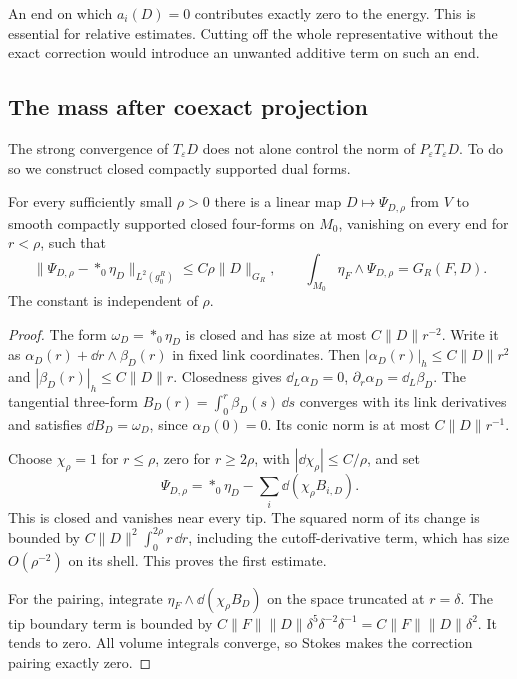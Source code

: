 An end on which $a_i(D)=0$ contributes exactly zero to the energy.
This is essential for relative estimates. Cutting off the whole
representative without the exact correction would introduce an
unwanted additive term on such an end.

\subsection{The mass after coexact projection}

The strong convergence of $T_\varepsilon D$ does not alone control
the norm of $P_\varepsilon T_\varepsilon D$. To do so we construct
closed compactly supported dual forms.

\begin{lemma}\label{lem:compact-duals}
For every sufficiently small $\rho>0$ there is a linear map
$D\mapsto\Psi_{D,\rho}$ from $V$ to smooth compactly supported
closed four-forms on $M_0$, vanishing on every end for $r<\rho$,
such that
\begin{equation}\label{eq:compact-dual-properties}
 \|\Psi_{D,\rho}-*_0\eta_D\|_{L^2(g_0^R)}
       \le C\rho\|D\|_{G_R},\qquad
 \int_{M_0}\eta_F\wedge\Psi_{D,\rho}=G_R(F,D).
\end{equation}
The constant is independent of $\rho$.
\end{lemma}
\begin{proof}
The form $\omega_D=*_0\eta_D$ is closed and has size at most
$C\|D\|r^{-2}$. Write it as
$\alpha_D(r)+\dd r\wedge\beta_D(r)$ in fixed link coordinates.
Then
$|\alpha_D(r)|_h\le C\|D\|r^2$ and
$|\beta_D(r)|_h\le C\|D\|r$.
Closedness gives
$\dd_L\alpha_D=0$, $\partial_r\alpha_D=\dd_L\beta_D$.
The tangential three-form
$B_D(r)=\int_0^r\beta_D(s)\,\dd s$ converges with its link
derivatives and satisfies
$\dd B_D=\omega_D$, since $\alpha_D(0)=0$. Its conic norm is
at most $C\|D\|r^{-1}$.

Choose $\chi_\rho=1$ for $r\le\rho$, zero for $r\ge2\rho$, with
$|\dd\chi_\rho|\le C/\rho$, and set
\[
 \Psi_{D,\rho}=*_0\eta_D-\sum_i\dd(\chi_\rho B_{i,D}).
\]
This is closed and vanishes near every tip. The squared norm of its
change is bounded by $C\|D\|^2\int_0^{2\rho}r\,\dd r$, including
the cutoff-derivative term, which has size $O(\rho^{-2})$ on its
shell. This proves the first estimate.

For the pairing, integrate
$\eta_F\wedge\dd(\chi_\rho B_D)$ on the space truncated at $r=\delta$.
The tip boundary term is bounded by
$C\|F\|\|D\|\delta^5\delta^{-2}\delta^{-1}
=C\|F\|\|D\|\delta^2$. It tends to zero. All volume integrals
converge, so Stokes makes the correction pairing exactly zero.
\end{proof}

